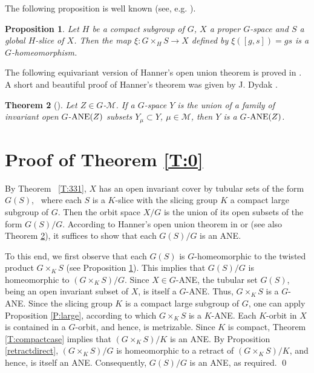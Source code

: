 \documentclass{amsart}
\newtheorem{theorem}{Theorem}[section]
\newtheorem{proposition}[theorem]{Proposition}
\begin{document}
\medskip
  
  The following proposition is well known  (see, e.g. \cite[Lemma 3.5]{abe:78}).
  
  \begin{proposition}\label{twist} Let  $H$ be a compact subgroup of $G$, $X$  a proper $G$-space and  $S$ a global $H$-slice of $X$.  Then  the  map  $\xi:G\times_H S\to X$ defined by $\xi([g, s])=gs$ is a $G$-homeomorphism.
\end{proposition}


\medskip

The following  equivariant version of   Hanner's open union theorem \cite[Theorem 19.2]{ha:52} is proved in \cite[Corollary 5.7]{ant:jap}. A  short and beautiful proof of Hanner's theorem 
was given by J. Dydak \cite[Corollary 1.5]{dy:pp}.

\begin{theorem}[\cite{ant:jap}]\label{T:Un} Let $Z\in G$-$\mathcal M$.
 If a  $G$-space $Y$ is the  union of a  family of  invariant open 
$G$-${\rm ANE}(Z)$ subsets $Y_\mu\subset Y$, $\mu\in \mathcal M$, then $Y$ is a $G$-${\rm ANE}(Z)$. 
\end{theorem}





   \medskip
  
  \section{ Proof  of Theorem \ref{T:0}}
  
   By Theorem~ \ref{T:331}, $X$ has  an open invariant cover by tubular sets of the form $G(S)$, \  where each $S$ is a $K$-slice with  the slicing group $K$  a   compact large  subgroup of $ G$. Then the orbit space $X/G$ is the  union of its open subsets of the form $G(S)/G$. According to  
Hanner's open union theorem  in \cite[Theorem 19.2]{ha:52} or \cite[Corollary 1.5]{dy:pp} (see also  
Theorem \ref{T:Un}), it suffices to show that each $G(S)/G$ is an {\rm ANE}.

To this end, we first observe that  each $G(S)$ is $G$-homeomorphic to the twisted product $G\times_{K} S$ (see Proposition \ref{twist}). This implies that $G(S)/G$ is homeomorphic to $(G\times_{K} S)/G$.
Since $X\in G$-{\rm ANE}, the tubular set  $G(S)$, being  an  open invariant subset of  $X$, is itself  a $G$-{\rm ANE}. Thus, $G\times_K S$ is a $G$-{\rm ANE}. Since the slicing group $K$  is a compact large subgroup of $G$, one can apply Proposition \ref{P:large}, according to which 
$G\times_{K} S$ is a $K$-{\rm ANE}. 
Each $K$-orbit in $X$ is contained in a $G$-orbit, and hence, is metrizable. Since $K$ is compact,  Theorem \ref{T:compactcase}  implies that
$(G\times_{K} S)/K$ is an {\rm ANE}. By Proposition \ref{retractdirect}, $(G\times_{K} S)/G$ is homeomorphic to a retract of $(G\times_{K} S)/K$, and hence, is itself  an {\rm ANE}. Consequently, $G(S)/G$ is an {\rm ANE},  as required.
\qed
  
\end{document}
